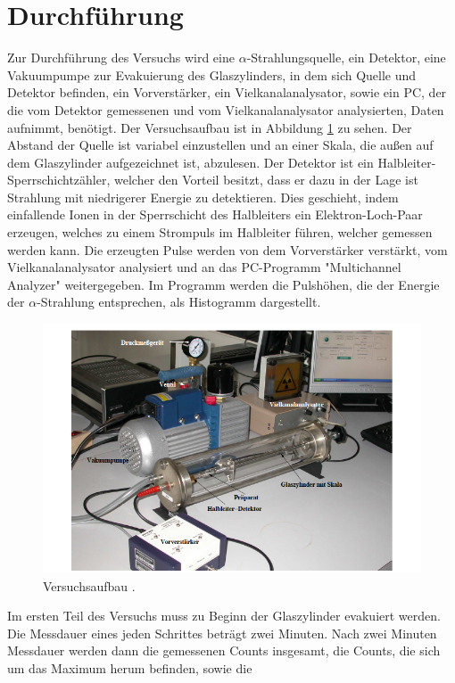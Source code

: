 \section{Durchführung}
Zur Durchführung des Versuchs wird eine $\alpha$-Strahlungsquelle, ein Detektor, eine Vakuumpumpe zur Evakuierung des Glaszylinders, in dem
sich Quelle und Detektor befinden, ein Vorverstärker, ein Vielkanalanalysator, sowie ein PC, der die vom Detektor gemessenen und vom
Vielkanalanalysator analysierten, Daten aufnimmt, benötigt. Der Versuchsaufbau ist in Abbildung \ref{abb1} zu sehen.
Der Abstand der Quelle ist variabel einzustellen und an einer Skala, die außen auf dem Glaszylinder aufgezeichnet ist, abzulesen.
Der Detektor ist ein Halbleiter-Sperrschichtzähler, welcher den Vorteil besitzt, dass er dazu in der Lage ist Strahlung mit niedrigerer Energie
zu detektieren. Dies geschieht, indem einfallende Ionen in der Sperrschicht des Halbleiters ein Elektron-Loch-Paar erzeugen, welches zu
einem Strompuls im Halbleiter führen, welcher gemessen werden kann. Die erzeugten Pulse werden von dem Vorverstärker verstärkt, vom
Vielkanalanalysator analysiert und an das PC-Programm "Multichannel Analyzer" weitergegeben. Im Programm werden die Pulshöhen, die der Energie
der $\alpha$-Strahlung entsprechen, als Histogramm dargestellt.
\FloatBarrier
\begin{figure}
  \centering
  \includegraphics[scale=0.6]{Aufbau.PNG}
  \caption{Versuchsaufbau \cite{Q1}.}
  \label{abb1}
\end{figure}
\FloatBarrier
\noindent Im ersten Teil des Versuchs muss zu Beginn der Glaszylinder evakuiert werden. Die Messdauer eines jeden Schrittes beträgt zwei Minuten.
Nach zwei Minuten Messdauer werden dann die gemessenen Counts insgesamt, die Counts, die sich um das Maximum herum befinden, sowie die
